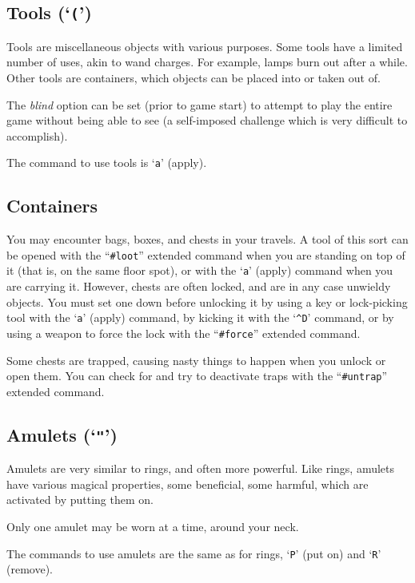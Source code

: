 \subsection*{Tools (`{\tt (}')}

Tools are miscellaneous objects with various purposes.  Some tools
have a limited number of uses, akin to wand charges.  For example, lamps burn
out after a while.  Other tools are containers, which objects can
be placed into or taken out of.

The {\it blind\/} option can be set (prior to game start) to attempt to
play the entire game without being able to see (a self-imposed challenge
which is very difficult to accomplish).

The command to use tools is `{\tt a}' (apply).

\subsection*{Containers}

You may encounter bags, boxes, and chests in your travels.  A tool of
this sort can be opened with the ``{\tt \#loot}'' extended command when
you are standing on top of it (that is, on the same floor spot),
or with the `{\tt a}' (apply) command when you are carrying it.  However,
chests are often locked, and are in any case unwieldy objects.
You must set one down before unlocking it by
using a key or lock-picking tool with the `{\tt a}' (apply) command,
by kicking it with the `{\tt \^{}D}' command,
or by using a weapon to force the lock with the ``{\tt \#force}''
extended command.

Some chests are trapped, causing nasty things to happen when you
unlock or open them.  You can check for and try to deactivate traps
with the ``{\tt \#untrap}'' extended command.

\subsection*{Amulets (`{\tt "}')}

Amulets are very similar to rings, and often more powerful.  Like
rings, amulets have various magical properties, some beneficial,
some harmful, which are activated by putting them on.

Only one amulet may be worn at a time, around your neck.

The commands to use amulets are the same as for rings, `{\tt P}' (put on)
and `{\tt R}' (remove).

